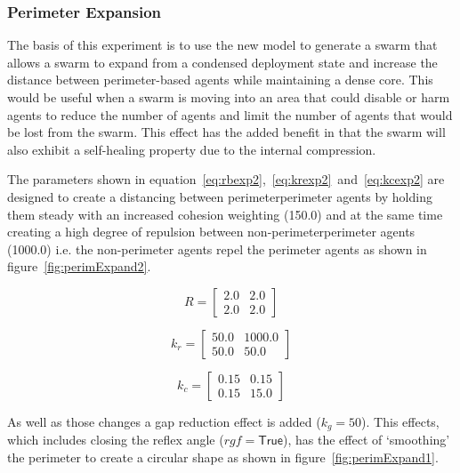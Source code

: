\documentclass[12pt,a4paper]{IEEEtran}
\newcommand{\kc}{\mathit{k_{c}}}
\newcommand{\kr}{\mathit{k_{r}}}
\newcommand{\kg}{\mathit{k_{g}}}
\newcommand{\rb}{\mathit{R}}
\newcommand{\rgf}{\mathit{rgf}}
\begin{document}
\subsubsection{Perimeter Expansion}
The basis of this experiment is to use the new model to generate a swarm that allows a swarm to expand from a condensed deployment state and increase the distance between perimeter-based agents while maintaining a dense core. This would be useful when a swarm is moving into an area that could disable or harm agents to reduce the number of agents and limit the number of agents that would be lost from the swarm. This effect has the added benefit in that the swarm will also exhibit a self-healing property due to the internal compression.

The parameters shown in equation~\ref{eq:rbexp2},~\ref{eq:krexp2}~and~\ref{eq:kcexp2} are designed to create a distancing between perimeter\textrightarrow perimeter agents by holding them steady with an increased cohesion weighting (150.0) and at the same time creating a high degree of repulsion between non-perimeter\textrightarrow perimeter agents (1000.0) i.e. the non-perimeter agents repel the perimeter agents as shown in figure~\ref{fig:perimExpand2}.

\begin{equation}\label{eq:rbexp2}
\rb = 
\begin{bmatrix}
2.0 & 2.0\\
2.0 & 2.0
\end{bmatrix}
\end{equation}

\begin{equation}\label{eq:krexp2}
\kr = 
\begin{bmatrix}
50.0 & 1000.0\\
50.0 & 50.0
\end{bmatrix}
\end{equation}

\begin{equation}\label{eq:kcexp2}
\kc = 
\begin{bmatrix}
0.15 & 0.15\\
0.15 & 15.0
\end{bmatrix}
\end{equation}

As well as those changes a gap reduction effect is added ($\kg=50$). This effects, which includes closing the reflex angle ($\rgf=\mathsf{True}$), has the effect of `smoothing' the perimeter to create a circular shape as shown in figure~\ref{fig:perimExpand1}.
\end{document}
